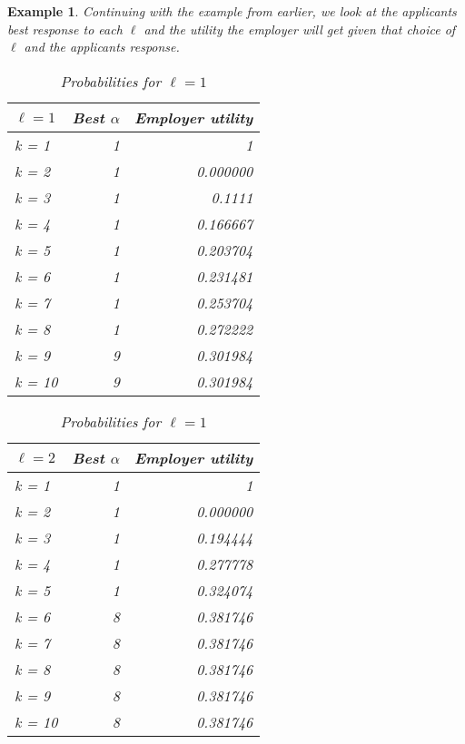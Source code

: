 \documentclass{article}
\newtheorem{example}{Example} %
\begin{document}
\begin{example}
Continuing with the example from earlier, we look at the applicants best response to each $\ell$ and the utility the employer will get given that choice of $\ell$ and the applicants response.

\begin{table}[H]
\centering
\begin{minipage}{0.33\textwidth}

\label{tab:table3}
\small
\begin{tabular}{lrr}
\hline
$\ell=1$ & Best $\alpha$ & Employer utility \\
\hline
k = 1  &     1 &         1 \\
k = 2  &     1 &         0.000000 \\
k = 3  &     1 &         0.1111 \\
k = 4  &     1 &         0.166667 \\
k = 5  &     1 &         0.203704 \\
k = 6  &     1 &         0.231481 \\
k = 7  &     1 &         0.253704 \\
k = 8  &     1 &         0.272222 \\
k = 9  &     9 &         0.301984 \\
k = 10 &     9 &         0.301984 \\
\hline
\end{tabular}
\caption{Probabilities for $\ell=1$}
\end{minipage}\hfill
\centering
\begin{minipage}{0.33\textwidth}
\small
\begin{tabular}{lrr}
\hline
$\ell=2$ & Best $\alpha$ & Employer utility \\
\hline
k = 1  &     1 &         1 \\
k = 2  &     1 &         0.000000 \\
k = 3  &     1 &         0.194444 \\
k = 4  &     1 &         0.277778 \\
k = 5  &     1 &         0.324074 \\
k = 6  &     8 &         0.381746 \\
k = 7  &     8 &         0.381746 \\
k = 8  &     8 &         0.381746 \\
k = 9  &     8 &         0.381746 \\
k = 10 &     8 &         0.381746 \\
\hline

\end{tabular}
\end{minipage}
\end{table}
\end{example}
\end{document}
